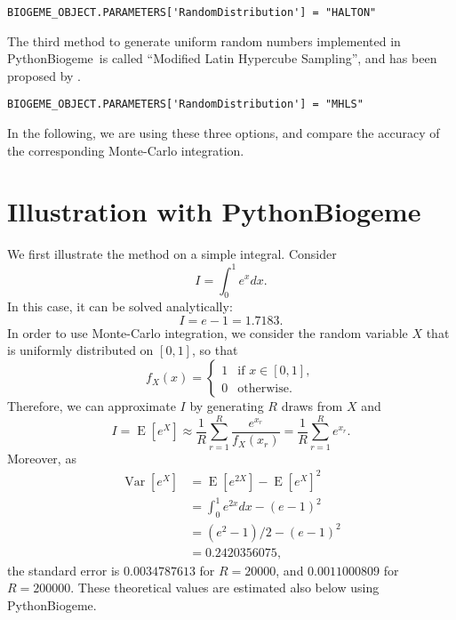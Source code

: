 \documentclass[12pt,a4paper]{article}
\newcommand{\expect}{\operatorname{E}}
\newcommand{\var}{\operatorname{Var}}
\newcommand{\PBIOGEME}{PythonBiogeme}
\begin{document}
\begin{lstlisting}
BIOGEME_OBJECT.PARAMETERS['RandomDistribution'] = "HALTON"
\end{lstlisting}


The third method to generate uniform random numbers implemented in
\PBIOGEME\ is called ``Modified Latin Hypercube Sampling'', and has been
proposed by .

\begin{lstlisting}
BIOGEME_OBJECT.PARAMETERS['RandomDistribution'] = "MHLS"
\end{lstlisting}


In the following, we are using these three options, and compare the
accuracy of the corresponding Monte-Carlo integration.


\section{Illustration with \PBIOGEME}
\label{sec:illustration}
We first illustrate the method on a simple integral.
Consider
\begin{equation}
I = \int_0^1 e^x dx.
\end{equation}
In this case, it can be solved analytically:
\begin{equation}
I = e - 1 = 1.7183.
\end{equation}
In order to use Monte-Carlo integration, we consider the random
variable $X$ that is uniformly distributed on $[0,1]$, so that
\begin{equation}
f_X(x) = \left\{
\begin{array}{ll}
1 & \text{if } x \in [0,1], \\
0 & \text{otherwise.}
\end{array}
\right.
\end{equation}
Therefore, we can approximate $I$ by generating $R$ draws from $X$ and
\begin{equation}
\label{eq:simpleMC}
I = \expect[e^X] \approx \frac{1}{R} \sum_{r=1}^R \frac{e^{x_r}}{f_X(x_r)} = \frac{1}{R} \sum_{r=1}^R e^{x_r}.
\end{equation}
Moreover, as
\begin{equation}
\begin{aligned}
\var[e^X] &= \expect[e^{2X}] - \expect[e^X]^2 \\
 &= \int_0^1 e^{2x}dx - (e-1)^2 \\
 &= (e^2-1)/2 - (e-1)^2 \\
 &= 0.2420356075,
\end{aligned}
\end{equation}
 the standard error  is  $0.0034787613$ for $R=20000$, and
 $0.0011000809$ for
$R=200000$. These theoretical values are estimated also below using \PBIOGEME. 
\end{document}
